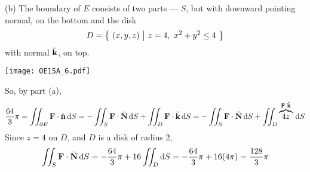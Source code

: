 \begin{solution}
(b) The boundary of $E$ consists of two parts --- $S$, but with downward
pointing normal, on the bottom and the disk
\begin{equation*}
D =\big\{ \ (x,y,z)\ \big|\ z=4,\ x^2+y^2\le 4\ \big\}
\end{equation*} 
with normal $\hat{\mathbf{k}}$, on top.
 \begin{center}
    \texttt{[image: OE15A\_6.pdf]}
\end{center}
So, by part (a),
\begin{align*}
\frac{64}{3}\pi =\iint_{\partial E}\mathbf{F}\cdot\hat{\mathbf{n}}\,\mathrm{d}S
=-\iint_S \mathbf{F}\cdot\hat{\mathbf{N}}\,\mathrm{d}S 
  +\iint_D \mathbf{F}\cdot\hat{\mathbf{k}}\,\mathrm{d}S
=-\iint_S \mathbf{F}\cdot\hat{\mathbf{N}}\,\mathrm{d}S 
  +\iint_D \overbrace{4z}^{\mathbf{F}\cdot\hat{\mathbf{k}}}\,\mathrm{d}S
\end{align*}
Since $z=4$ on $D$, and $D$ is a disk of radius 2,
\begin{align*}
\iint_S \mathbf{F}\cdot\hat{\mathbf{N}}\,\mathrm{d}S 
=-\frac{64}{3}\pi +16\iint_D \mathrm{d}S
=-\frac{64}{3}\pi +16(4\pi)
=\frac{128}{3}\pi
\end{align*}
\end{solution}


